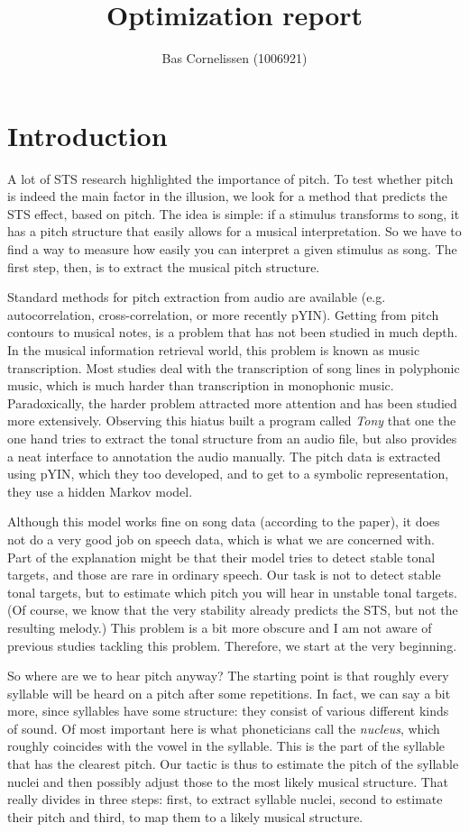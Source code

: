 \documentclass[a4paper,9pt]{article}
\title{\textbf{Optimization report}}
\author{Bas Cornelissen (1006921)}
\begin{document}
\maketitle

\section{Introduction}
A lot of STS research highlighted the importance of pitch. To test whether pitch is indeed the main factor in the illusion, we look for a method that predicts the STS effect, based on pitch. The idea is simple: if a stimulus transforms to song, it has a pitch structure that easily allows for a musical interpretation. So we have to find a way to measure how easily you can interpret a given stimulus as song. The first step, then, is to extract the musical pitch structure. 

Standard methods for pitch extraction from audio are available (e.g. autocorrelation, cross-correlation, or more recently pYIN). Getting from pitch contours to musical notes, is a problem that has not been studied in much depth. In the musical information retrieval world, this problem is known as music transcription. Most studies deal with the transcription of song lines in polyphonic music, which is much harder than transcription in monophonic music. Paradoxically, the harder problem attracted more attention and has been studied more extensively. Observing this hiatus \citeauthor{Mauch2015c} built a program called \emph{Tony} that one the one hand tries to extract the tonal structure from an audio file, but also provides a neat interface to annotation the audio manually. The pitch data is extracted using pYIN, which they too developed, and to get to a symbolic representation, they use a hidden Markov model. 

Although this model works fine on song data (according to the paper), it does not do a very good job on speech data, which is what we are concerned with. Part of the explanation might be that their model tries to detect stable tonal targets, and those are rare in ordinary speech. Our task is not to detect stable tonal targets, but to estimate which pitch you will hear in unstable tonal targets. (Of course, we know that the very stability already predicts the STS, but not the resulting melody.) This problem is a bit more obscure and I am not aware of previous studies tackling this problem. Therefore, we start at the very beginning.

So where are we to hear pitch anyway? The starting point is that roughly every syllable will be heard on a pitch after some repetitions. In fact, we can say a bit more, since syllables have some structure: they consist of various different kinds of sound. Of most important here is what phoneticians call the \emph{nucleus}, which roughly coincides with the vowel in the syllable. This is the part of the syllable that has the clearest pitch. Our tactic is thus to estimate the pitch of the syllable nuclei and then possibly adjust those to the most likely musical structure. That really divides in three steps: first, to extract syllable nuclei, second to estimate their pitch and third, to map them to a likely musical structure.
\end{document}
